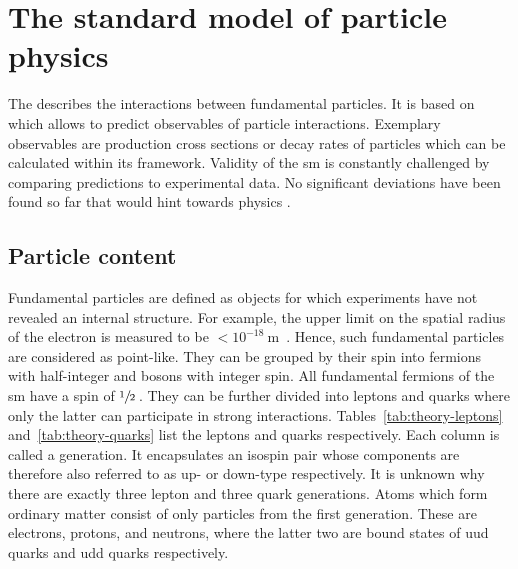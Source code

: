 \chapter{The standard model of particle physics}
\label{ch:theory}


The  describes the interactions between fundamental particles. It is based on  which allows to predict observables of particle interactions. Exemplary observables are production cross sections or decay rates of particles which can be calculated within its framework. Validity of the \gls{sm} is constantly challenged by comparing predictions to experimental data. No significant deviations have been found so far that would hint towards physics .


\section{Particle content}

Fundamental particles are defined as objects for which experiments have not revealed an internal structure. For example, the upper limit on the spatial radius of the electron is measured to be $<10^{-18}~\mathrm{m}$~\cite{PhysRevLett.97.030801}. Hence, such fundamental particles are considered as point-like. They can be grouped by their spin into fermions with half-integer and bosons with integer spin. All fundamental fermions of the \gls{sm} have a spin of $\sfrac{1}{2}\,$. They can be further divided into leptons and quarks where only the latter can participate in strong interactions. Tables~\ref{tab:theory-leptons} and~\ref{tab:theory-quarks} list the leptons and quarks respectively. Each column is called a generation. It encapsulates an isospin pair whose components are therefore also referred to as up- or down-type respectively. It is unknown why there are exactly three lepton and three quark generations. Atoms which form ordinary matter consist of only particles from the first generation. These are electrons, protons, and neutrons, where the latter two are bound states of uud quarks and udd quarks respectively.

